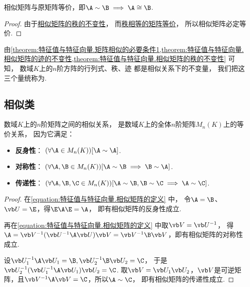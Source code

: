 \begin{property}
相似矩阵与原矩阵等价，即\(\A\sim\B \implies \A\cong\B\).
\begin{proof}
由于\hyperref[theorem:特征值与特征向量.相似矩阵的秩的不变性]{相似矩阵的秩的不变性}，
而\hyperref[theorem:矩阵乘积的秩.矩阵等价的充分必要条件]{秩相等的矩阵等价}，
所以相似矩阵必定等价.
\end{proof}
\end{property}

\begin{remark}
由\cref{theorem:特征值与特征向量.矩阵相似的必要条件1,theorem:特征值与特征向量.相似矩阵的迹的不变性,theorem:特征值与特征向量.相似矩阵的秩的不变性} 可知，
数域\(K\)上的\(n\)阶方阵的行列式、秩、迹
都是相似关系下的不变量，
我们把这三个量统称为.
\end{remark}

\subsection{相似类}
\begin{property}\label{theorem:特征值与特征向量.相似关系是等价关系}
数域\(K\)上的\(n\)阶矩阵之间的相似关系，
是数域\(K\)上的全体\(n\)阶矩阵\(M_n(K)\)上的等价关系，
因为它满足：\begin{itemize}
	\item {\rm\bf 反身性}：
	\((\forall \A \in M_n(K))
	[\A\sim\A]\).

	\item {\rm\bf 对称性}：
	\((\forall \A,\B \in M_n(K))
	[\A \sim \B \implies \B \sim \A]\).

	\item {\rm\bf 传递性}：
	\((\forall \A,\B,\C \in M_n(K))
	[\A \sim \B, \B \sim \C \implies \A \sim \C]\).
\end{itemize}
\begin{proof}
在\cref{equation:特征值与特征向量.相似矩阵的定义} 中，
令\(\A=\B\)、\(\P=\E\)，得\(\E\A\E=\A\)，
即有相似矩阵的反身性成立.

再在\cref{equation:特征值与特征向量.相似矩阵的定义} 中取\(\Q=\P^{-1}\)，
得\(\A = \Q^{-1}(\P^{-1}\A\P)\Q = \Q^{-1}\B\Q\)，即有相似矩阵的对称性成立.

设\(\P_1^{-1}\A\P_1=\B,
\P_2^{-1}\B\P_2=\C\)，
于是\(\P_2^{-1}(\P_1^{-1}\A\P_1)\P_2=\C\).
取\(\Q=\P_1\P_2\)，\(\Q\)是可逆矩阵，且\(\Q^{-1}\A\Q=\C\)，所以\(\A\sim\C\)，
即有相似矩阵的传递性成立.
\end{proof}
\end{property}

